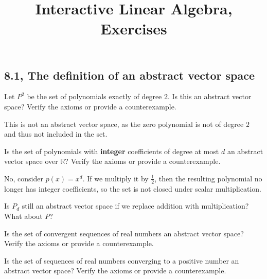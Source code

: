\documentclass[12pt]{amsart}
\title{Interactive Linear Algebra, Exercises}
\begin{document}
\subsection{8.1, The definition of an abstract vector space}
\begin{problems}

\problem Let \(P^2\) be the set of polynomials exactly of degree \(2\). Is this an abstract vector space? Verify the axioms or provide a counterexample.

\begin{solution}
    This is not an abstract vector space, as the zero polynomial is not of degree \(2\) and thus not included in the set.
\end{solution}

\problem Is the set of polynomials with \textbf{integer} coefficients of degree at most \(d\) an abstract vector space over \(\mathbb{R}\)? Verify the axioms or provide a counterexample.

\begin{solution}
    No, consider \(p(x) = x^d\). If we multiply it by \(\frac{1}{2}\), then the resulting polynomial no longer has integer coefficients, so the set is not closed under scalar multiplication. 
\end{solution}

\problem Is \(P_d\) still an abstract vector space if we replace addition with multiplication? What about \(P\)?

\problem Is the set of convergent sequences of real numbers an abstract vector space? Verify the axioms or provide a counterexample.

\problem Is the set of sequences of real numbers converging to a positive number an abstract vector space? Verify the axioms or provide a counterexample.









\end{problems}
\end{document}
